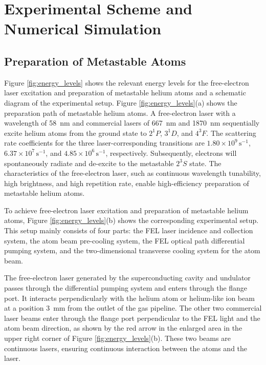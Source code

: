 \documentclass[12pt,a4paper]{article}
\begin{document}
\section{Experimental Scheme and Numerical Simulation}

\subsection{Preparation of Metastable Atoms}

Figure \ref{fig:energy_levels} shows the relevant energy levels for the free-electron laser excitation and preparation of metastable helium atoms and a schematic diagram of the experimental setup. Figure \ref{fig:energy_levels}(a) shows the preparation path of metastable helium atoms. A free-electron laser with a wavelength of \SI{58}{nm} and commercial lasers of \SI{667}{nm} and \SI{1870}{nm} sequentially excite helium atoms from the ground state to $2^1P$, $3^1D$, and $4^3F$. The scattering rate coefficients for the three laser-corresponding transitions are $1.80 \times 10^9 \, \text{s}^{-1}$, $6.37 \times 10^7 \, \text{s}^{-1}$, and $4.85 \times 10^6 \, \text{s}^{-1}$, respectively. Subsequently, electrons will spontaneously radiate and de-excite to the metastable $2^3S$ state. The characteristics of the free-electron laser, such as continuous wavelength tunability, high brightness, and high repetition rate, enable high-efficiency preparation of metastable helium atoms.

To achieve free-electron laser excitation and preparation of metastable helium atoms, Figure \ref{fig:energy_levels}(b) shows the corresponding experimental setup. This setup mainly consists of four parts: the FEL laser incidence and collection system, the atom beam pre-cooling system, the FEL optical path differential pumping system, and the two-dimensional transverse cooling system for the atom beam.

The free-electron laser generated by the superconducting cavity and undulator passes through the differential pumping system and enters through the flange port. It interacts perpendicularly with the helium atom or helium-like ion beam at a position \SI{3}{mm} from the outlet of the gas pipeline. The other two commercial laser beams enter through the flange port perpendicular to the FEL light and the atom beam direction, as shown by the red arrow in the enlarged area in the upper right corner of Figure \ref{fig:energy_levels}(b). These two beams are continuous lasers, ensuring continuous interaction between the atoms and the laser.
\end{document}
